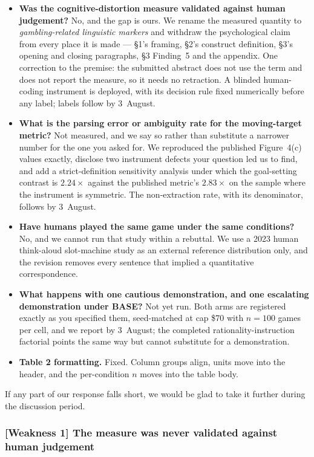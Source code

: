 \begin{itemize}
\item \textbf{Was the cognitive-distortion measure validated against human judgement?} No, and
the gap is ours. We rename the measured quantity to \emph{gambling-related linguistic markers}
and withdraw the psychological claim from every place it is made --- §1's framing, §2's construct
definition, §3's opening and closing paragraphs, §3 Finding~5 and the appendix. One correction to
the premise: the submitted abstract does not use the term and does not report the measure, so it
needs no retraction. A blinded human-coding instrument is deployed, with its decision rule fixed
numerically before any label; labels follow by 3~August.
\item \textbf{What is the parsing error or ambiguity rate for the moving-target metric?} Not
measured, and we say so rather than substitute a narrower number for the one you asked for. We
reproduced the published Figure~4(c) values exactly, disclose two instrument defects your
question led us to find, and add a strict-definition sensitivity analysis under which the
goal-setting contrast is $2.24\times$ against the published metric's $2.83\times$ on the sample
where the instrument is symmetric. The non-extraction rate, with its denominator, follows by
3~August.
\item \textbf{Have humans played the same game under the same conditions?} No, and we cannot run
that study within a rebuttal. We use a 2023 human think-aloud slot-machine study as an external
reference distribution only, and the revision removes every sentence that implied a quantitative
correspondence.
\item \textbf{What happens with one cautious demonstration, and one escalating demonstration
under BASE?} Not yet run. Both arms are registered exactly as you specified them, seed-matched at
cap \$70 with $n = 100$ games per cell, and we report by 3~August; the completed
rationality-instruction factorial points the same way but cannot substitute for a demonstration.
\item \textbf{Table 2 formatting.} Fixed. Column groups align, units move into the header, and
the per-condition $n$ moves into the table body.
\end{itemize}

If any part of our response falls short, we would be glad to take it further during the
discussion period.

\subsubsection*{\textbf{[Weakness 1]} The measure was never validated against human judgement}

